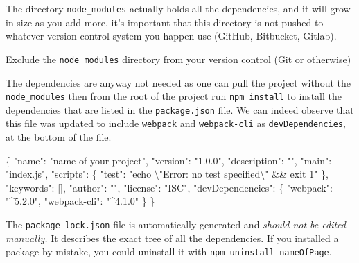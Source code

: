 \documentclass[10pt,]{krantz}
\makeatletter
\newenvironment{Shaded}{\begin{snugshade}}{\end{snugshade}}
\newcommand{\CharTok}[1]{\textcolor[rgb]{0.5,0.5,0.5}{#1}}
\newcommand{\DataTypeTok}[1]{\textcolor[rgb]{0.27,0.27,0.27}{#1}}
\newcommand{\FunctionTok}[1]{\textcolor[rgb]{0,0,0}{#1}}
\newcommand{\OtherTok}[1]{\textcolor[rgb]{0.37,0.37,0.37}{#1}}
\newcommand{\StringTok}[1]{\textcolor[rgb]{0.5,0.5,0.5}{#1}}
\newenvironment{kframe}{%
\medskip{}
\setlength{\fboxsep}{.8em}
 \def\at@end@of@kframe{}%
 \ifinner\ifhmode%
  \def\at@end@of@kframe{\end{minipage}}%
  \begin{minipage}{\columnwidth}%
 \fi\fi%
 \def\FrameCommand##1{\hskip\@totalleftmargin \hskip-\fboxsep
 \colorbox{shadecolor}{##1}\hskip-\fboxsep
     \hskip-\linewidth \hskip-\@totalleftmargin \hskip\columnwidth}%
 \MakeFramed {\advance\hsize-\width
   \@totalleftmargin\z@ \linewidth\hsize
   \@setminipage}}%
 {\par\unskip\endMakeFramed%
 \at@end@of@kframe}
\renewenvironment{Shaded}{\begin{kframe}}{\end{kframe}}
\newenvironment{rmdblock}[1]
  {
  \begin{itemize}
  \renewcommand{\labelitemi}{
    \raisebox{-.7\height}[0pt][0pt]{
      {\setkeys{Gin}{width=3em,keepaspectratio}\texttt{[image: images/\#1]}}
    }
  }
  \setlength{\fboxsep}{1em}
  \begin{kframe}
  \item
  }
  {
  \end{kframe}
  \end{itemize}
  }
\newenvironment{rmdnote}
  {\begin{rmdblock}{note}}
  {\end{rmdblock}}
\makeatother
\begin{document}
The directory \texttt{node\_modules} actually holds all the dependencies, and it will grow in size as you add more, it's important that this directory is not pushed to whatever version control system you happen use (GitHub, Bitbucket, Gitlab).

\begin{rmdnote}
Exclude the \texttt{node\_modules} directory from your version control
(Git or otherwise)
\end{rmdnote}

The dependencies are anyway not needed as one can pull the project without the \texttt{node\_modules} then from the root of the project run \texttt{npm\ install} to install the dependencies that are listed in the \texttt{package.json} file. We can indeed observe that this file was updated to include \texttt{webpack} and \texttt{webpack-cli} as \texttt{devDependencies}, at the bottom of the file.

\begin{Shaded}
\begin{Highlighting}[]
\FunctionTok{\{}
  \DataTypeTok{"name"}\FunctionTok{:} \StringTok{"name-of-your-project"}\FunctionTok{,}
  \DataTypeTok{"version"}\FunctionTok{:} \StringTok{"1.0.0"}\FunctionTok{,}
  \DataTypeTok{"description"}\FunctionTok{:} \StringTok{""}\FunctionTok{,}
  \DataTypeTok{"main"}\FunctionTok{:} \StringTok{"index.js"}\FunctionTok{,}
  \DataTypeTok{"scripts"}\FunctionTok{:} \FunctionTok{\{}
    \DataTypeTok{"test"}\FunctionTok{:} \StringTok{"echo }\CharTok{\textbackslash{}"}\StringTok{Error: no test specified}\CharTok{\textbackslash{}"}\StringTok{ && exit 1"}
  \FunctionTok{\},}
  \DataTypeTok{"keywords"}\FunctionTok{:} \OtherTok{[]}\FunctionTok{,}
  \DataTypeTok{"author"}\FunctionTok{:} \StringTok{""}\FunctionTok{,}
  \DataTypeTok{"license"}\FunctionTok{:} \StringTok{"ISC"}\FunctionTok{,}
  \DataTypeTok{"devDependencies"}\FunctionTok{:} \FunctionTok{\{}
    \DataTypeTok{"webpack"}\FunctionTok{:} \StringTok{"^5.2.0"}\FunctionTok{,}
    \DataTypeTok{"webpack-cli"}\FunctionTok{:} \StringTok{"^4.1.0"}
  \FunctionTok{\}}
\FunctionTok{\}}
\end{Highlighting}
\end{Shaded}

The \texttt{package-lock.json} file is automatically generated and \emph{should not be edited manually.} It describes the exact tree of all the dependencies. If you installed a package by mistake, you could uninstall it with \texttt{npm\ uninstall\ nameOfPage}.
\end{document}
